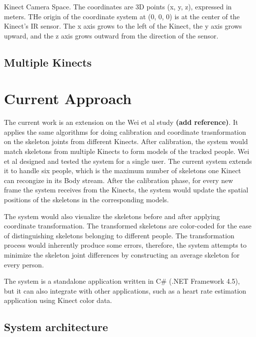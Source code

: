 \documentclass{sigchi}
\begin{document}
Kinect Camera Space. The coordinates are 3D points (x, y, z), expressed in meters. THe origin of the coordinate system at (0, 0, 0) is at the center of the Kinect's IR sensor. The x axis grows to the left of the Kinect, the y axis grows upward, and the z axis grows outward from the direction of the sensor.

\cite{microsoft_kinect_coordinates}

\subsection{Multiple Kinects}

\section{Current Approach}

The current work is an extension on the Wei et al study \textbf{(add reference)}. It applies the same algorithms for doing calibration and coordinate trasnformation on the skeleton joints from different Kinects. After calibration, the system would match skeletons from multiple Kinects to form models of the tracked people. Wei et al designed and tested the system for a single user. The current system extends it to handle six people, which is the maximum number of skeletons one Kinect can recongize in its Body stream. After the calibration phase, for every new frame the system receives from the Kinects, the system would update the spatial positions of the skeletons in the corresponding models.

The system would also visualize the skeletons before and after applying coordinate transformation. The transformed skeletons are color-coded for the ease of distinguishing skeletons belonging to different people. The transformation process would inherently produce some errors, therefore, the system attempts to minimize the skeleton joint differences by constructing an average skeleton for every person.

The system is a standalone application written in C# (.NET Framework 4.5), but it can also integrate with other applications, such as a heart rate estimation application using Kinect color data.

\subsection{System architecture}
\end{document}
